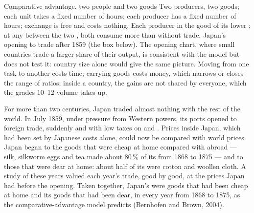 \begin{model}{Comparative advantage, two people and two goods}
\assumes Two producers, two goods; each unit takes a fixed number of hours; each
producer has a fixed number of hours; exchange is free and costs nothing.
\predicts Each producer  in the good of its lower ; at any
 between the two , both consume more than without trade.
\tested Japan's opening to trade after 1859 (the box below). The opening chart, where
small countries trade a larger share of their output, is consistent with the model but
does not test it: country size alone would give the same picture.
\breaks Moving from one task to another costs time; carrying goods costs money, which
narrows or closes the range of ratios; inside a country, the gains are not shared by
everyone, which the grades 10--12 volume takes up.
\end{model}

\begin{record}[Japan opens to trade]
For more than two centuries, Japan traded almost nothing with the rest of the world.
In July 1859, under pressure from Western powers, its ports opened to foreign trade,
suddenly and with low taxes on  and . Prices inside Japan, which had
been set by Japanese costs alone, could now be compared with world prices. Japan began
to  the goods that were cheap at home compared with abroad --- silk, silkworm eggs
and tea made about 80\,\% of its  from 1868 to 1875 --- and to  those that
were dear at home: about half of its  were cotton and woollen cloth. A study of
these years valued each year's trade, good by good, at the prices Japan had before the
opening. Taken together, Japan's  were goods that had been cheap at home and its
 goods that had been dear, in every year from 1868 to 1875, as the
comparative-advantage model predicts (Bernhofen and Brown, 2004).
\end{record}

